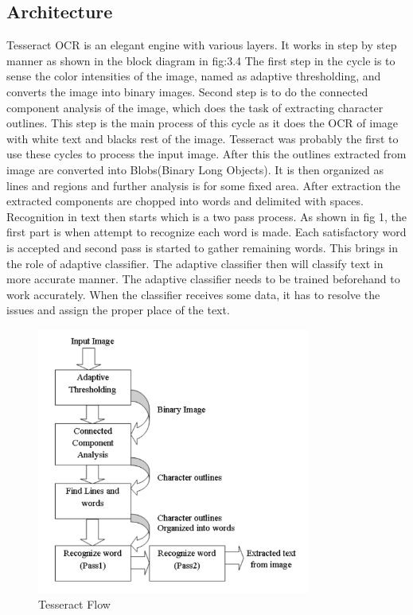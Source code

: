 \subsection{Architecture}
Tesseract OCR is an elegant engine with various layers. It works in step by step manner as
shown in the block diagram in fig:3.4 The first step in the cycle is to sense the color intensities of the image, named as adaptive thresholding, and converts the image into binary images.
Second step is to do the connected component analysis of the image, which does the task of
extracting character outlines. This step is the main process of this cycle as it does the OCR of
image with white text and blacks rest of the image.
Tesseract was probably the first to use these cycles to process the input image. After this the
outlines extracted from image are converted into Blobs(Binary Long Objects). It is then organized as lines and regions and further analysis is for some fixed area. After extraction
the extracted components are chopped into words and delimited with spaces. Recognition in text
then starts which is a two pass process. As shown in fig 1, the first part is when attempt to
recognize each word is made. Each satisfactory word is accepted and second pass is started to
gather remaining words. This brings in the role of adaptive classifier. The adaptive classifier then will classify text in more accurate manner. The adaptive classifier needs to be trained beforehand
to work accurately. When the classifier receives some data, it has to resolve the issues and assign
the proper place of the text.\cite{TesseractORCEngine} \cite{TesseractORCEngine2}

\begin{figure}[H]
\centering
\label{fig:flow} 
\includegraphics[width=0.8\textwidth]{tesseractFlow}
\caption {Tesseract Flow}
\end{figure}

